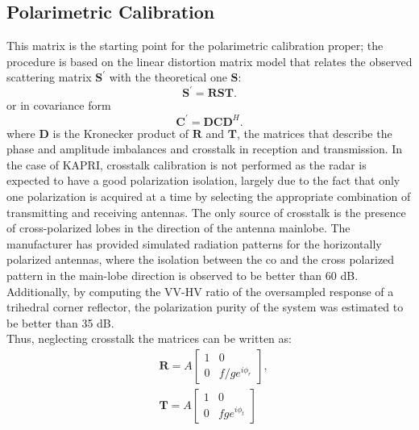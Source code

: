 \subsection{Polarimetric Calibration}\label{sec:proc_polcal}
This matrix is the starting point for the polarimetric calibration proper;
the procedure is based on the linear distortion matrix model\cite{Saraband1990, Sarabandi1992a} that relates the observed scattering matrix $\mathbf{S^\prime}$ with the theoretical one $\mathbf{S}$:
\begin{equation}\label{eq:distorsion_scattering}
	\mathbf{S^\prime} = \mathbf{R} \mathbf{S} \mathbf{T}.
\end{equation}
or in covariance form
\begin{equation}\label{eq:covariance_distortion}
	\mathbf{C}^\prime = \mathbf{D} \mathbf{C} \mathbf{D}^{H}.
\end{equation}
where $\mathbf{D}$ is the Kronecker product of $\mathbf{R}$ and $\mathbf{T}$, the matrices that describe the phase and amplitude imbalances and crosstalk in reception and transmission.
In the case of KAPRI, crosstalk calibration is not performed as the radar is expected to have a good polarization isolation, largely due to the fact that only one polarization is acquired at a time by selecting the appropriate combination of transmitting and receiving antennas. The only source of crosstalk is the presence of cross-polarized lobes in the direction of the antenna mainlobe. The manufacturer has provided simulated radiation patterns for the horizontally polarized antennas, where the isolation between the co and the cross polarized pattern in the main-lobe direction is observed to be better than 60 dB. Additionally, by computing the VV-HV ratio of the oversampled response of a trihedral corner reflector, the polarization purity of the system was estimated to be better than 35 dB.\\
Thus, neglecting crosstalk the matrices can be written as:
\begin{equation}
	\begin{aligned}
	&\mathbf{R} = A \begin{bmatrix}
		1 & 0\\
		0 & f/g e^{i\phi_{r}}
	\end{bmatrix},\\
	&\mathbf{T} = A \begin{bmatrix}
			1 & 0\\
			0 & f g e^{i\phi_{t}}
		\end{bmatrix}
	\end{aligned}
\end{equation}
